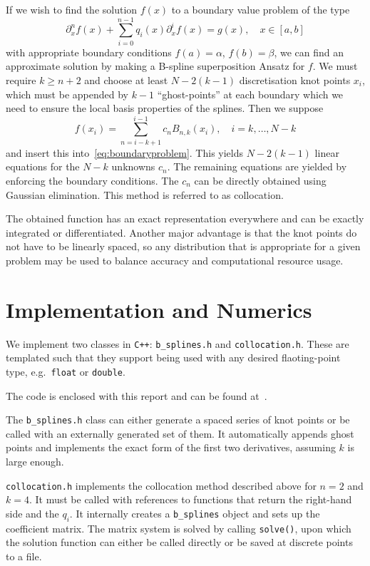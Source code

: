 \documentclass[a4paper,DIV=12,english]{scrartcl}
\begin{document}
If we wish to find the solution $f(x)$ to a boundary value problem of the type
\begin{equation}\label{eq:boundaryproblem}
    \partial_x^n f(x) + \sum_{i=0}^{n-1}q_i(x)\partial_x^{i}f(x) = g(x), \quad x\in[a, b]
\end{equation}
with appropriate boundary conditions $f(a) = \alpha$, $f(b)=\beta$, we can find an approximate solution by making a B-spline superposition Ansatz for $f$. We must require $k\geq n+2$ and choose at least $N-2(k-1)$ discretisation knot points $x_i$, which must be appended by $k-1$ \enquote{ghost-points} at each boundary which we need to ensure the local basis properties of the splines. Then we suppose
\begin{equation}
    f(x_i) = \sum_{n=i-k+1}^{i-1} c_n B_{n,k}(x_i), \quad i = k,\dots,N-k
\end{equation}
and insert this into~\eqref{eq:boundaryproblem}. This yields $N-2(k-1)$ linear equations for the $N-k$ unknowns $c_n$. The remaining equations are yielded by enforcing the boundary conditions. The $c_n$ can be directly obtained using Gaussian elimination. This method is referred to as collocation.

The obtained function has an exact representation everywhere and can be exactly integrated or differentiated. Another major advantage is that the knot points do not have to be linearly spaced, so any distribution that is appropriate for a given problem may be used to balance accuracy and computational resource usage.

\FloatBarrier
\section{Implementation and Numerics}
We implement two classes in \texttt{C++}: \texttt{b\_splines.h} and \texttt{collocation.h}. These are templated such that they support being used with any desired flaoting-point type, e.g.\ \texttt{float} or \texttt{double}.

The code is enclosed with this report and can be found at~\cite{github}.

The \texttt{b\_splines.h} class can either generate a spaced series of knot points or be called with an externally generated set of them. It automatically appends ghost points and implements the exact form of the first two derivatives, assuming $k$ is large enough.

\texttt{collocation.h} implements the collocation method described above for $n=2$ and $k=4$. It must be called with references to functions that return the right-hand side and the $q_i$. It internally creates a \texttt{b\_splines} object and sets up the coefficient matrix. The matrix system is solved by calling \texttt{solve()}, upon which the solution function can either be called directly or be saved at discrete points to a file.
\end{document}
